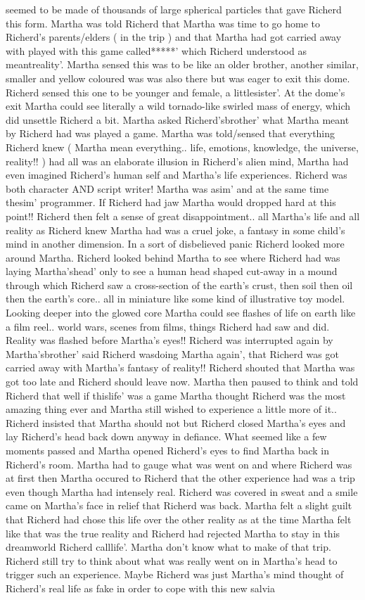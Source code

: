 \documentclass[12pt]{book}
\begin{document}
seemed to be made of thousands of large spherical particles that gave Richerd this form. Martha was told Richerd that Martha was time to go home to Richerd's parents/elders ( in the trip ) and that Martha had got carried away with played with this game called*****' which Richerd understood as meantreality'. Martha sensed this was to be like an older brother, another similar, smaller and yellow coloured was was also there but was eager to exit this dome. Richerd sensed this one to be younger and female, a littlesister'. At the dome's exit Martha could see literally a wild tornado-like swirled mass of energy, which did unsettle Richerd a bit. Martha asked Richerd'sbrother' what Martha meant by Richerd had was played a game. Martha was told/sensed that everything Richerd knew ( Martha mean everything.. life, emotions, knowledge, the universe, reality!! ) had all was an elaborate illusion in Richerd's alien mind, Martha had even imagined Richerd's human self and Martha's life experiences. Richerd was both character AND script writer! Martha was asim' and at the same time thesim' programmer. If Richerd had jaw Martha would dropped hard at this point!! Richerd then felt a sense of great disappointment.. all Martha's life and all reality as Richerd knew Martha had was a cruel joke, a fantasy in some child's mind in another dimension. In a sort of disbelieved panic Richerd looked more around Martha. Richerd looked behind Martha to see where Richerd had was laying Martha'shead' only to see a human head shaped cut-away in a mound through which Richerd saw a cross-section of the earth's crust, then soil then oil then the earth's core.. all in miniature like some kind of illustrative toy model. Looking deeper into the glowed core Martha could see flashes of life on earth like a film reel.. world wars, scenes from films, things Richerd had saw and did. Reality was flashed before Martha's eyes!! Richerd was interrupted again by Martha'sbrother' said Richerd wasdoing Martha again', that Richerd was got carried away with Martha's fantasy of reality!! Richerd shouted that Martha was got too late and Richerd should leave now. Martha then paused to think and told Richerd that well if thislife' was a game Martha thought Richerd was the most amazing thing ever and Martha still wished to experience a little more of it.. Richerd insisted that Martha should not but Richerd closed Martha's eyes and lay Richerd's head back down anyway in defiance. What seemed like a few moments passed and Martha opened Richerd's eyes to find Martha back in Richerd's room. Martha had to gauge what was went on and where Richerd was at first then Martha occured to Richerd that the other experience had was a trip even though Martha had intensely real. Richerd was covered in sweat and a smile came on Martha's face in relief that Richerd was back. Martha felt a slight guilt that Richerd had chose this life over the other reality as at the time Martha felt like that was the true reality and Richerd had rejected Martha to stay in this dreamworld Richerd calllife'. Martha don't know what to make of that trip. Richerd still try to think about what was really went on in Martha's head to trigger such an experience. Maybe Richerd was just Martha's mind thought of Richerd's real life as fake in order to cope with this new salvia 
\end{document}
